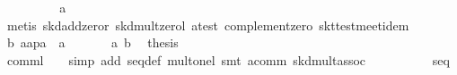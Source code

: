 \begin{isabellebody}
\ \ \ \ \isamarkupfalse%
\ \isamarkupfalse%
\ {}{}{}{}\ {}\ a{}{}\isanewline
\ \ \ \ \ \ \isamarkupfalse%
\ {}metis\ skd{}add{}zeror\ skd{}mult{}zerol\ a{}test\ complement{}zero\ skt{}test{}meet{}idem{}\isanewline
\ \ \ \ \isamarkupfalse%
\ \isamarkupfalse%
\ b{}\ {}a{}{}{}{}a{}{}p{}{}{}a{}\ {}\ a{}{}\ \isamarkupfalse%
\isanewline
\isanewline
\ \ \ \ \isamarkupfalse%
\ a\ b\ \isamarkupfalse%
\ {}thesis\isanewline
\ \ \ \ \ \ \isamarkupfalse%
\ {}comml{}\ {}\ {}\ {}{}\ simp\ add{}\ seq{}def\ mult{}onel{}\ smt\ a{}comm\ skd{}mult{}assoc{}\isanewline
\ \ \isamarkupfalse%
\isanewline
\isanewline
\ \ \isamarkupfalse%
\ \isamarkupfalse%
\ {}{}{}{}\ {}\ seq\isanewline

\end{isabellebody}
